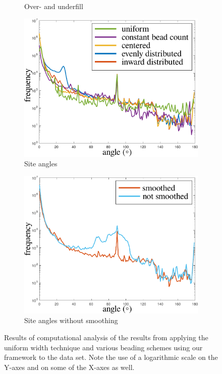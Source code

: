 \begin{figure}
\begin{subfigure}{\figwidth}
\caption{Over- and underfill}
\label{over_underfill}
\end{subfigure}
\begin{subfigure}{\figwidth}\centering
\includegraphics[height=\figheight]{sources/validation/smoothness.pdf}
\caption{Site angles}
\label{smoothness}
\end{subfigure}
\begin{subfigure}{\figwidth}\centering
\includegraphics[height=\figheight]{sources/validation/smoothnessNoTransition.pdf}
\caption{Site angles without smoothing}
\label{smoothnessNoTransition}
\end{subfigure}


\caption{
Results of computational analysis of the results from applying the uniform width technique and various beading schemes using our framework to the data set.
Note the use of a logarithmic scale on the Y-axes and on some of the X-axes as well.
}
\end{figure}
